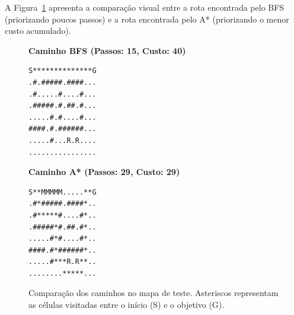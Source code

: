 \documentclass[12pt]{article}
\begin{document}
\begin{table}[H]
\centering
\caption{Resultados dos algoritmos de busca no mapa de teste.}
\label{tab:grid}
\end{table}

A Figura~\ref{fig:paths} apresenta a comparação visual entre a rota encontrada pelo BFS (priorizando poucos passos) e a rota encontrada pelo A* (priorizando o menor custo acumulado).

\begin{figure}[H]
\centering
\vspace{-2mm}
\footnotesize
\begin{minipage}{0.48\textwidth}
\centering
\textbf{Caminho BFS (Passos: 15, Custo: 40)}
\begin{verbatim}
S**************G
.#.#####.####...
.#.....#....#...
.#####.#.##.#...
.....#.#....#...
####.#.######...
.....#...R.R....
................
\end{verbatim}
\end{minipage}
\hfill
\begin{minipage}{0.48\textwidth}
\centering
\textbf{Caminho A* (Passos: 29, Custo: 29)}
\begin{verbatim}
S**MMMMM.....**G
.#*#####.####*..
.#*****#....#*..
.#####*#.##.#*..
.....#*#....#*..
####.#*######*..
.....#***R.R**..
........*****...
\end{verbatim}
\end{minipage}
\vspace{-2mm}
\caption{Comparação dos caminhos no mapa de teste. Asteriscos representam as células visitadas entre o início (S) e o objetivo (G).}
\label{fig:paths}
\vspace{-2mm}
\end{figure}
\end{document}
